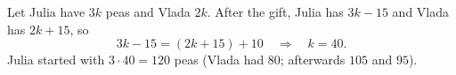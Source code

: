 Let Julia have $3k$ peas and Vlada $2k$. After the gift, Julia has $3k-15$ and Vlada has $2k+15$, so
\[
3k-15=(2k+15)+10\quad\Longrightarrow\quad k=40 .
\]
Julia started with $3\cdot40=\boxed{120}$ peas (Vlada had $80$; afterwards $105$ and $95$).
